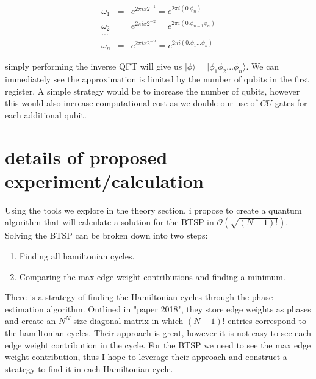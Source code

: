 \documentclass[twocolumn,showpacs,preprintnumbers,amsmath,amssymb]{revtex4}
\begin{document}
		\begin{eqnarray*}
			\omega_1 &=& e^{2\pi i x 2^{-1}} =  e^{2\pi i (0.\phi_n)}\\
			\omega_2 &=& e^{2\pi i x 2^{-2}} =  e^{2\pi i (0.\phi_{n-1}\phi_n)}\\
			...\\
			\omega_n &=& e^{2\pi i x 2^{-n}} =  e^{2\pi i (0.\phi_1...\phi_n)}
		\end{eqnarray*}
		
		simply performing the inverse QFT will give us $|\phi\rangle =  |\phi_1\phi_2 ... \phi_n\rangle$.  We can immediately see the approximation is limited by the number of qubits in the first register. A simple strategy would be to increase the number of qubits, however this would also increase computational cost as we double our use of $CU$ gates for each additional qubit.
		
		
		
		
		
		
		\section{details of proposed experiment/calculation}
		
		
		Using the tools we explore in the theory section, i propose to create a quantum algorithm that will calculate a solution for the BTSP in $\mathcal{O}(\sqrt{(N-1)!})$. Solving the BTSP can be broken down into two steps:
		
		\begin{enumerate}
			\item Finding all hamiltonian cycles.
			\item Comparing the max edge weight contributions and finding a minimum.
		\end{enumerate}
		
		There is a strategy of finding the Hamiltonian cycles through the phase estimation algorithm.  Outlined in "paper 2018", they store edge weights as phases and create an $N^N$ size diagonal matrix in which $(N-1)!$ entries correspond to the hamiltonian cycles. Their approach is great, however it is not easy to see each edge weight contribution in the cycle. For the BTSP we need to see the max edge weight contribution, thus I hope to leverage their approach and construct a strategy to find it in each Hamiltonian cycle.
		
\end{document}

